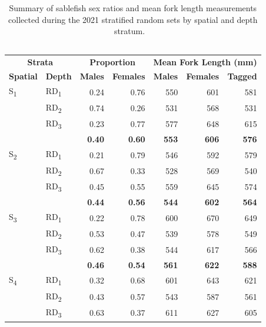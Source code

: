 \documentclass[12pt]{article}\usepackage[]{graphicx}\usepackage[]{color}
\begin{document}
\begin{table}[!h]

\caption{\label{tab:table6}Summary of sablefish sex ratios and mean fork length measurements collected during the 2021 stratified random sets by spatial and depth stratum. ~\\
\hspace*{0.333em}\\}
\fontsize{9}{11}\selectfont
\begin{tabular}[t]{llrrrrr}
\toprule
\multicolumn{2}{c}{\textbf{Strata}} & \multicolumn{2}{c}{\textbf{Proportion}} & \multicolumn{3}{c}{\textbf{Mean Fork Length (mm)}} \\
\cmidrule(l{3pt}r{3pt}){1-2} \cmidrule(l{3pt}r{3pt}){3-4} \cmidrule(l{3pt}r{3pt}){5-7}
\textbf{Spatial} & \textbf{Depth} & \textbf{Males} & \textbf{Females} & \textbf{Males} & \textbf{Females} & \textbf{Tagged}\\
\midrule
S\textsubscript{1} & RD\textsubscript{1} & 0.24 & 0.76 & 550 & 601 & 581\\
 & RD\textsubscript{2} & 0.74 & 0.26 & 531 & 568 & 531\\
 & RD\textsubscript{3} & 0.23 & 0.77 & 577 & 648 & 615\\
\midrule
\textbf{} & \textbf{} & \textbf{0.40} & \textbf{0.60} & \textbf{553} & \textbf{606} & \textbf{576}\\
\midrule
S\textsubscript{2} & RD\textsubscript{1} & 0.21 & 0.79 & 546 & 592 & 579\\
 & RD\textsubscript{2} & 0.67 & 0.33 & 528 & 569 & 540\\
 & RD\textsubscript{3} & 0.45 & 0.55 & 559 & 645 & 574\\
\midrule
\textbf{} & \textbf{} & \textbf{0.44} & \textbf{0.56} & \textbf{544} & \textbf{602} & \textbf{564}\\
\midrule
S\textsubscript{3} & RD\textsubscript{1} & 0.22 & 0.78 & 600 & 670 & 649\\
 & RD\textsubscript{2} & 0.53 & 0.47 & 539 & 578 & 549\\
 & RD\textsubscript{3} & 0.62 & 0.38 & 544 & 617 & 566\\
\midrule
\textbf{} & \textbf{} & \textbf{0.46} & \textbf{0.54} & \textbf{561} & \textbf{622} & \textbf{588}\\
\midrule
S\textsubscript{4} & RD\textsubscript{1} & 0.32 & 0.68 & 601 & 643 & 621\\
 & RD\textsubscript{2} & 0.43 & 0.57 & 543 & 587 & 561\\
 & RD\textsubscript{3} & 0.63 & 0.37 & 611 & 627 & 605\\

\end{tabular}
\end{table}
\end{document}
